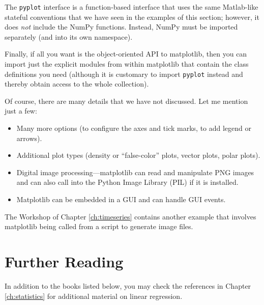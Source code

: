 The \texttt{pyplot}  interface is a function-based interface that uses
the same Matlab-like stateful conventions that we have seen in the
examples of this section; however, it does \emph{not} include the
NumPy functions.  Instead, NumPy must be imported separately (and into
its own namespace).

Finally, if all you want is the object-oriented API to matplotlib,
then you can import just the explicit modules from within matplotlib
that contain\vadjust{\pagebreak} the class definitions you need (although it is customary
to import \texttt{pyplot} instead and thereby obtain access to the
whole collection).

Of course, there are many details that we have not discussed. Let me
mention just a few: 

\begin{itemize}
\item Many more options (to configure the axes and tick marks, to add
   legend or arrows).
\item Additional plot types (density or ``false-color'' plots, vector
  plots, polar plots).
\item Digital image processing---matplotlib can read and manipulate PNG
  images and can also call into the Python Image Library (PIL) if
  it is installed.
\item Matplotlib can be embedded in a GUI and can handle GUI events.
\end{itemize}

The Workshop of Chapter \ref{ch:timeseries} contains another example
that involves matplotlib being called from a script to generate image
files.


\section{Further Reading}

In addition to the books listed below, you may check the references
in Chapter \ref{ch:statistics} for additional material on linear
regression.

